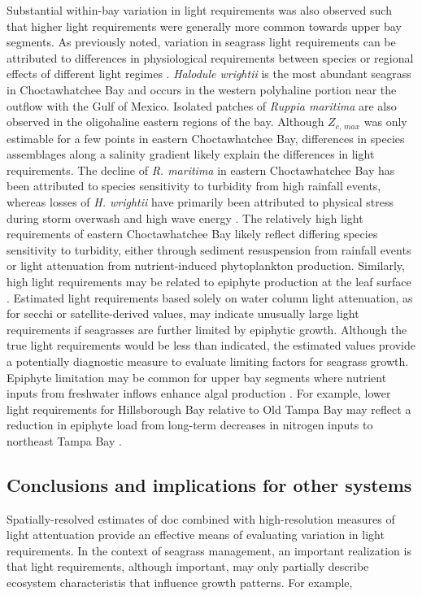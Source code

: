 \documentclass[letterpaper,12pt,oneside]{article}\usepackage[]{graphicx}\usepackage[]{color}
\begin{document}
Substantial within-bay variation in light requirements was also observed such that higher light requirements were generally more common towards upper bay segments.  As previously noted, variation in seagrass light requirements can be attributed to differences in physiological requirements between species or regional effects of different light regimes \citep{Choice14}.  \textit{Halodule wrightii} is the most abundant seagrass in Choctawhatchee Bay and occurs in the western polyhaline portion near the outflow with the Gulf of Mexico.  Isolated patches of \textit{Ruppia maritima} are also observed in the oligohaline eastern regions of the bay. Although $Z_{c,\,max}$ was only estimable for a few points in eastern Choctawhatchee Bay, differences in species assemblages along a salinity gradient likely explain the differences in light requirements. The decline of \textit{R. maritima} in eastern Choctawhatchee Bay has been attributed to species sensitivity to turbidity from high rainfall events, whereas losses of \textit{H. wrightii} have primarily been attributed to physical stress during storm overwash and high wave energy .  The relatively high light requirements of eastern Choctawhatchee Bay likely reflect differing species sensitivity to turbidity, either through sediment resuspension from rainfall events or light attenuation from nutrient-induced phytoplankton production.  Similarly, high light requirements may be related to epiphyte production at the leaf surface \citep{Kemp04}.  Estimated light requirements based solely on water column light attenuation, as for secchi or satellite-derived values, may indicate unusually large light requirements if seagrasses are further limited by epiphytic growth.  Although the true light requirements would be less than indicated, the estimated values provide a potentially diagnostic measure to evaluate limiting factors for seagrass growth.  Epiphyte limitation may be common for upper bay segments where nutrient inputs from freshwater inflows enhance algal production \citep{Kemp04}.  For example, lower light requirements for Hillsborough Bay relative to Old Tampa Bay may reflect a reduction in epiphyte load from long-term decreases in nitrogen inputs to northeast Tampa Bay \citep{Dawes10}.

\subsection{Conclusions and implications for other systems}

Spatially-resolved estimates of \ac{doc} combined with high-resolution measures of light attentuation provide an effective means of evaluating variation in light requirements.  In the context of seagrass management, an important realization is that light requirements, although important, may only partially describe ecosystem characteristis that influence growth patterns.  For example, 
\end{document}
